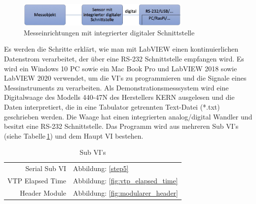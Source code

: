 \begin{figure}[h!] %
\centering
\includegraphics[width=0.75\textwidth]{Bilder/sensor_digitale_schnittstelle.jpg}
\vspace{0em}
 \caption[Messeinrichtungen mit integrierter digitaler Schnittstelle]{Messeinrichtungen mit integrierter digitaler Schnittstelle}\label{fig:sensor_digitale_schnittstelle}
\end{figure}

 Es werden die Schritte erklärt, wie man mit LabVIEW einen kontinuierlichen Datenstrom verarbeitet, der über eine RS-232 Schnittstelle empfangen wird. Es wird ein Windows 10 PC sowie ein Mac Book Pro und LabVIEW 2018 sowie LabVIEW 2020 verwendet, um die VI's zu programmieren und die Signale eines Messinstruments zu verarbeiten. Als Demonstrationsmesssystem wird eine Digitalwaage des Modells 440-47N des Herstellers KERN ausgelesen und die Daten interpretiert, die in eine Tabulator getrennten Text-Datei (*.txt) geschrieben werden. Die Waage hat einen integrierten analog/digital Wandler und besitzt eine RS-232 Schnittstelle. Das Programm wird aus mehreren Sub VI's (siehe Tabelle\,\ref{tab:subvis}) und dem Haupt VI bestehen. \\

\begin{table}[h] %
\caption{Sub VI's}
\begin{center}
\begin{tabular}{r|l}
\onehalfspacing
Serial Sub VI \hspace{6pt} & \hspace{6pt} Abbildung: \ref{step5} \\
VTP Elapsed Time  \hspace{6pt} & \hspace{6pt} Abbildung: \ref{fig:vtp_elapsed_time}   \\
Header Module \hspace{6pt} & \hspace{6pt} Abbildung: \ref{fig:modularer_header}  \\

\end{tabular}
\end{center}
\label{tab:subvis}
\end{table}


